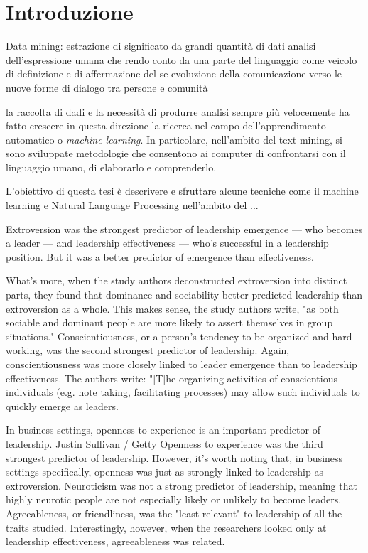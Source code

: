 \chapter{Introduzione}
\label{chap:introduzione}
\Blindtext

Data mining: estrazione di significato da grandi quantità di dati
analisi dell'espressione umana che rendo conto da una parte del linguaggio come veicolo di definizione e di affermazione del se
evoluzione della comunicazione verso le nuove forme di dialogo tra persone e comunità

la raccolta di dadi e la necessità di produrre analisi sempre più velocemente ha fatto crescere in questa direzione la ricerca nel campo dell'apprendimento automatico o \emph{machine learning}.
In particolare, nell'ambito del text mining, si sono sviluppate metodologie che consentono ai computer di confrontarsi con il linguaggio umano, di elaborarlo e comprenderlo.


L'obiettivo di questa tesi è descrivere e sfruttare alcune tecniche come il machine learning e Natural Language Processing nell'ambito del ... 


Extroversion was the strongest predictor of leadership emergence — who becomes a leader — and leadership effectiveness — who's successful in a leadership position. But it was a better predictor of emergence than effectiveness.

What's more, when the study authors deconstructed extroversion into distinct parts, they found that dominance and sociability better predicted leadership than extroversion as a whole. This makes sense, the study authors write, "as both sociable and dominant people are more likely to assert themselves in group situations."
Conscientiousness, or a person's tendency to be organized and hard-working, was the second strongest predictor of leadership.
Again, conscientiousness was more closely linked to leader emergence than to leadership effectiveness. The authors write: "[T]he organizing activities of conscientious individuals (e.g. note taking, facilitating processes) may allow such individuals to quickly emerge as leaders.

In business settings, openness to experience is an important predictor of leadership. Justin Sullivan / Getty
Openness to experience was the third strongest predictor of leadership. However, it's worth noting that, in business settings specifically, openness was just as strongly linked to leadership as extroversion.
Neuroticism was not a strong predictor of leadership, meaning that highly neurotic people are not especially likely or unlikely to become leaders.
Agreeableness, or friendliness, was the "least relevant" to leadership of all the traits studied. Interestingly, however, when the researchers looked only at leadership effectiveness, agreeableness was related.




